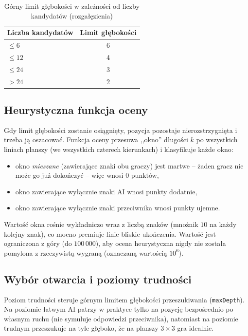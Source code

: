\begin{table}[H]
\centering
\caption{Górny limit głębokości w zależności od liczby kandydatów (rozgałęzienia)}
\begin{tabular}{@{}lc@{}}
\toprule
\textbf{Liczba kandydatów} & \textbf{Limit głębokości}\\
\midrule
$\le 6$  & 6\\
$\le 12$ & 4\\
$\le 24$ & 3\\
$> 24$   & 2\\
\bottomrule
\end{tabular}
\end{table}

\subsection{Heurystyczna funkcja oceny}

Gdy limit głębokości zostanie osiągnięty, pozycja pozostaje nierozstrzygnięta i trzeba ją oszacować.
Funkcja oceny przesuwa ,,okno'' długości $k$ po wszystkich liniach planszy (we wszystkich czterech
kierunkach) i klasyfikuje każde okno:
\begin{itemize}
    \item okno \emph{mieszane} (zawierające znaki obu graczy) jest martwe -- żaden gracz nie może
          go już dokończyć -- więc wnosi $0$ punktów,
    \item okno zawierające wyłącznie znaki AI wnosi punkty dodatnie,
    \item okno zawierające wyłącznie znaki przeciwnika wnosi punkty ujemne.
\end{itemize}
Wartość okna rośnie wykładniczo wraz z liczbą znaków (mnożnik $10$ na każdy kolejny znak), co mocno
premiuje linie bliskie ukończenia. Wartość jest ograniczona z góry (do $100\,000$), aby ocena
heurystyczna nigdy nie została pomylona z rzeczywistą wygraną (oznaczaną wartością $10^{6}$).

\subsection{Wybór otwarcia i poziomy trudności}

Poziom trudności steruje górnym limitem głębokości przeszukiwania (\texttt{maxDepth}). Na poziomie
łatwym AI patrzy w praktyce tylko na pozycję bezpośrednio po własnym ruchu (nie symuluje odpowiedzi
przeciwnika), natomiast na poziomie trudnym przeszukuje na tyle głęboko, że na planszy $3\times3$
gra idealnie.


